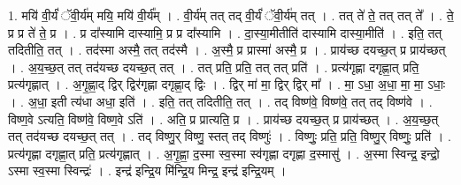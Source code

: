 \documentclass[17pt]{extarticle}
\begin{document}
1. मयि॑ वी॒र्यं॑ ॅवी॒र्य॑म् मयि॒ मयि॑ वी॒र्य᳚म् । . वी॒र्य॑म् तत् तद् वी॒र्यं॑ ॅवी॒र्य॑म् तत् । . तत् ते॑ ते॒ तत् तत् ते᳚ । . ते॒ प्र प्र ते॑ ते॒ प्र । . प्र दा᳚स्यामि दास्यामि॒ प्र प्र दा᳚स्यामि । . दा॒स्या॒मीतीति॑ दास्यामि दास्या॒मीति॑ । . इति॒ तत् तदितीति॒ तत् । . तद॑स्मा अस्मै॒ तत् तद॑स्मै । . अ॒स्मै॒ प्र प्रास्मा॑ अस्मै॒ प्र । . प्राय॑च्छ दयच्छ॒त् प्र प्राय॑च्छत् । . अ॒य॒च्छ॒त् तत् तद॑यच्छ दयच्छ॒त् तत् । . तत् प्रति॒ प्रति॒ तत् तत् प्रति॑ । . प्रत्य॑गृह्णा दगृह्णा॒त् प्रति॒ प्रत्य॑गृह्णात् । . अ॒गृ॒ह्णा॒द् द्विर् द्विर॑गृह्णा दगृह्णा॒द् द्विः । . द्विर् मा॑ मा॒ द्विर् द्विर् मा᳚ । . मा॒ ऽधा॒ अ॒धा॒ मा॒ मा॒ ऽधाः॒ । . अ॒धा॒ इती त्य॑धा अधा॒ इति॑ । . इति॒ तत् तदितीति॒ तत् । . तद् विष्ण॑वे॒ विष्ण॑वे॒ तत् तद् विष्ण॑वे । . विष्ण॒वे ऽत्यति॒ विष्ण॑वे॒ विष्ण॒वे ऽति॑ । . अति॒ प्र प्रात्यति॒ प्र । . प्राय॑च्छ दयच्छ॒त् प्र प्राय॑च्छत् । . अ॒य॒च्छ॒त् तत् तद॑यच्छ दयच्छ॒त् तत् । . तद् विष्णु॒र् विष्णु॒ स्तत् तद् विष्णुः॑ । . विष्णुः॒ प्रति॒ प्रति॒ विष्णु॒र् विष्णुः॒ प्रति॑ । . प्रत्य॑गृह्णा दगृह्णा॒त् प्रति॒ प्रत्य॑गृह्णात् । . अ॒गृ॒ह्णा॒ द॒स्मा स्व॒स्मा स्व॑गृह्णा दगृह्णा द॒स्मासु॑ । . अ॒स्मा स्विन्द्र॒ इन्द्रो॒ ऽस्मा स्व॒स्मा स्विन्द्रः॑ । . इन्द्र॑ इन्द्रि॒य मि॑न्द्रि॒य मिन्द्र॒ इन्द्र॑ इन्द्रि॒यम् । \newline
\end{document}
